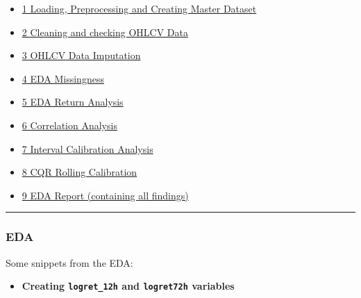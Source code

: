 \documentclass[
  a4paper,
  DIV=11,
  numbers=noendperiod]{scrreprt}
\providecommand{\tightlist}{%
  \setlength{\itemsep}{0pt}\setlength{\parskip}{0pt}}
\begin{document}
\begin{itemize}
\tightlist
\item
  \href{https://github.com/KetchupJL/solana-qrf-interval-forecasting/blob/main/notebooks/Data\%20Processing/01data_processing.ipynb}{1
  Loading, Preprocessing and Creating Master Dataset}
\item
  \href{https://github.com/KetchupJL/solana-qrf-interval-forecasting/blob/main/notebooks/Data\%20Processing/02cleaning_ohlcv_data.ipynb}{2
  Cleaning and checking OHLCV Data}
\item
  \href{https://github.com/KetchupJL/solana-qrf-interval-forecasting/blob/main/notebooks/Data\%20Processing/02cleaning_ohlcv_data.ipynb}{3
  OHLCV Data Imputation}
\item
  \href{https://github.com/KetchupJL/solana-qrf-interval-forecasting/blob/main/notebooks/EDA/01_EDA_missingness.ipynb}{4
  EDA Missingness}
\item
  \href{https://github.com/KetchupJL/solana-qrf-interval-forecasting/blob/main/notebooks/EDA/02_EDA_return_analysis.ipynb}{5
  EDA Return Analysis}
\item
  \href{https://github.com/KetchupJL/solana-qrf-interval-forecasting/blob/main/notebooks/EDA/03_EDA_corr_redu_analysis.ipynb}{6
  Correlation Analysis}
\item
  \href{https://github.com/KetchupJL/solana-qrf-interval-forecasting/blob/main/notebooks/EDA/04_EDA_interval_calib.ipynb}{7
  Interval Calibration Analysis}
\item
  \href{https://github.com/KetchupJL/solana-qrf-interval-forecasting/blob/main/notebooks/EDA/05_CQR_rolling_calibration.ipynb}{8
  CQR Rolling Calibration}
\item
  \href{https://github.com/KetchupJL/solana-qrf-interval-forecasting/blob/main/notebooks/EDA/EDA_REPORT.ipynb}{9
  EDA Report (containing all findings)}
\end{itemize}

\begin{center}\rule{0.5\linewidth}{0.5pt}\end{center}

\subsubsection{EDA}\label{eda}

Some snippets from the EDA:

\begin{itemize}
\tightlist
\item
  \textbf{Creating \texttt{logret\_12h} and \texttt{logret72h}
  variables}
\end{itemize}
\end{document}
